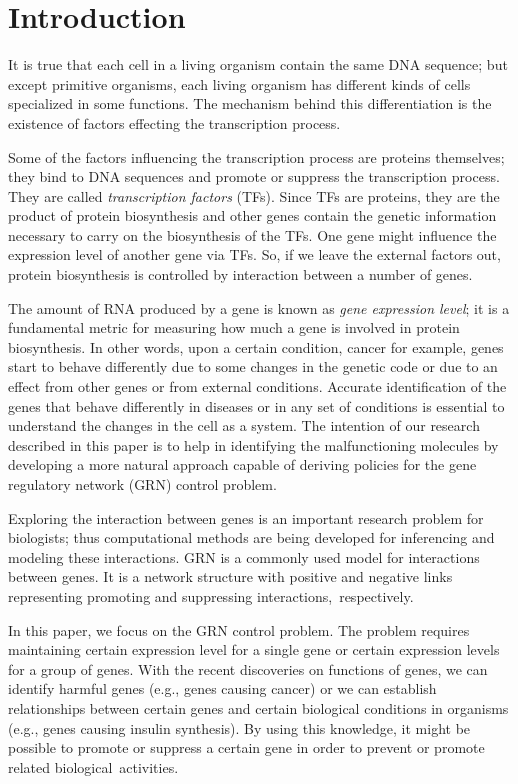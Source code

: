 \chapter{Introduction}
\label{chapter:introduction}

It is true that each cell in a living organism contain the same DNA sequence; but except primitive organisms,
each living organism has different kinds of cells specialized in some functions. The mechanism behind this
differentiation is the existence of factors effecting the transcription process. 

Some of the factors influencing the transcription process are proteins themselves; they bind to DNA sequences
and promote or suppress the transcription process. They are called \emph{transcription factors} (TFs). Since
TFs are proteins, they are the product of protein biosynthesis and other genes contain the genetic
information necessary to carry on the biosynthesis of the TFs. One gene might influence the expression level
of another gene via TFs. So, if we leave the external factors out, protein biosynthesis is controlled by
interaction between a number of genes.

The amount of RNA produced by a gene is known as \emph{gene expression level}; it is a fundamental 
metric for measuring how much a gene is involved in protein biosynthesis.
 In other words, upon a certain condition, cancer for example, genes
start to behave differently due to some changes in the genetic code or due to an effect from other genes or
from external conditions. Accurate identification of the genes that behave differently in diseases or in any
set of conditions is essential to understand the changes in the cell as a system.  The intention of our
research described in this paper is to help in identifying the malfunctioning molecules by developing a more
natural approach capable of deriving policies for the gene regulatory network (GRN) control problem.

Exploring the interaction between genes is an important research problem for biologists; thus computational
methods are being developed for inferencing and modeling these interactions. GRN is a commonly used model
for interactions between genes. It is a network structure with positive and negative links representing
promoting and suppressing interactions,~respectively.

In this paper, we focus on the GRN control problem. The problem requires maintaining certain expression level
for a single gene or certain expression levels for a group of genes. With the recent discoveries on functions
of genes, we can identify harmful genes (e.g., genes causing cancer) or we can establish relationships
between certain genes and certain biological conditions in organisms (e.g., genes causing insulin synthesis).
By using this knowledge, it might be possible to promote or suppress a certain gene in order to prevent or
promote related biological~activities.


